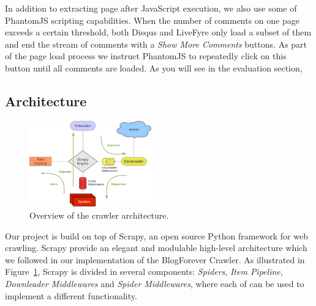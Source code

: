 In addition to extracting page after JavaScript execution, we also use some of PhantomJS scripting capabilities. When the number of comments on one page exceeds a certain threshold, both Disqus and LiveFyre only load a subset of them and end the stream of comments with a \emph{Show More Comments} buttons. As part of the page load process we instruct PhantomJS to repeatedly click on this button until all comments are loaded. As you will see in the evaluation section, 


\subsection{Architecture}

\begin{figure}
  \centering
  \includegraphics[width=0.47\textwidth]{img/scrapy_architecture.png}
  \caption{Overview of the crawler architecture.}
  \label{architecture}
\end{figure}

Our project is build on top of Scrapy\cite{scrapy2013}, an open source Python framework for web crawling. Scrapy provide an elegant and modulable high-level architecture which we followed in our implementation of the BlogForever Crawler. As illustrated in Figure~\ref{architecture}, Scrapy is divided in several components: \emph{Spiders}, \emph{Item Pipeline}, \emph{Downleader Middlewares} and \emph{Spider Middlewares}, where each of can be used to implement a different functionality.

